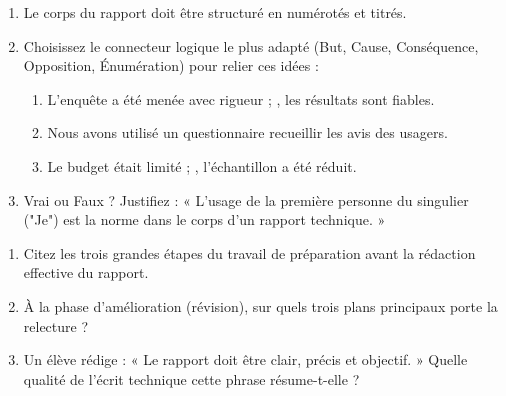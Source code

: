 \documentclass[11pt]{article}
\begin{document}
\begin{exercice}
\begin{enumerate}
    \item Le corps du rapport doit être structuré en \underline{\hspace{3cm}} numérotés et titrés.
    \item Choisissez le connecteur logique le plus adapté (But, Cause, Conséquence, Opposition, Énumération) pour relier ces idées :
    \begin{enumerate}
        \item L'enquête a été menée avec rigueur ; \underline{\hspace{3cm}}, les résultats sont fiables.
        \item Nous avons utilisé un questionnaire \underline{\hspace{3cm}} recueillir les avis des usagers.
        \item Le budget était limité ; \underline{\hspace{3cm}}, l'échantillon a été réduit.
    \end{enumerate}
    \item Vrai ou Faux ? Justifiez : « L'usage de la première personne du singulier ("Je") est la norme dans le corps d'un rapport technique. »
\end{enumerate}
\end{exercice}

\begin{exercice}
\begin{enumerate}
    \item Citez les trois grandes étapes du travail de préparation avant la rédaction effective du rapport.
    \item À la phase d'amélioration (révision), sur quels trois plans principaux porte la relecture ?
    \item Un élève rédige : « Le rapport doit être clair, précis et objectif. » Quelle qualité de l'écrit technique cette phrase résume-t-elle ?
\end{enumerate}
\end{exercice}
\end{document}
